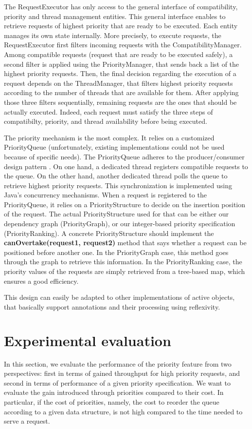 \documentclass[11pt]{report}
\begin{document}
The RequestExecutor has only access to the general interface of compatibility, priority and thread management entities. This general interface enables to retrieve requests of highest priority that are ready to be executed. Each entity manages its own state internally. More precisely, to execute requests, the RequestExecutor first filters incoming requests with the CompatibilityManager. Among compatible requests (request that are ready to be executed safely), a second filter is applied using the PriorityManager, that sends back a list of the highest priority requests. Then, the final decision regarding the execution of a request depends on the ThreadManager, that filters highest priority requests according to the number of threads that are available for them. After applying those three filters sequentially, remaining requests are the ones that should be actually executed. Indeed, each request must satisfy the three steps of compatibilty, priority, and thread availability before being executed. 

The priority mechanism is the most complex. It relies on a customized PriorityQueue (unfortunately, existing implementations could not be used because of specific needs). The PriorityQueue adheres to the producer/consumer design pattern \cite{ref:producerconsumer}. On one hand, a dedicated thread registers compatible requests to the queue. On the other hand, another dedicated thread polls the queue to retrieve highest priority requests. This synchronization is implemented using Java's concurrency mechanisms. When a request is registered to the PriorityQueue, it relies on a PriorityStructure to decide on the insertion position of the request. The actual PriorityStructure used for that can be either our dependency graph (PriorityGraph), or our integer-based priority specification (PriorityRanking). A concrete PriorityStructure should implement the \textbf{canOvertake(request1, request2)} method that says whether a request can be positioned before another one. In the PriorityGraph case, this method goes through the graph to retrieve this information. In the PriorityRanking case, the priority values of the requests are simply retrieved from a tree-based map, which ensures a good efficiency.

This design can easily be adapted to other implementations of active objects, that basically support annotations and their processing using reflexivity. 


\section{Experimental evaluation}\label{sec:experiments}
In this section, we evaluate the performance of the priority feature from two perspectives: first in terms of gained throughput for high priority requests, and second in terms of performance of a given priority specification. We want to evaluate the gain introduced through priorities compared to their cost.
In particular, if the cost of priorities, namely, the cost to reorder the queue according to a given data structure, is not high compared to the time needed to serve a request.
\end{document}
